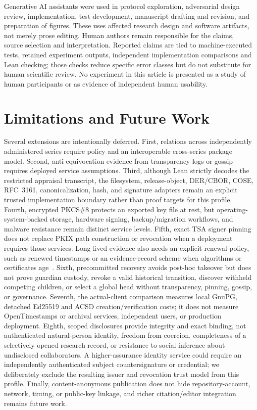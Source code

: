 \documentclass[acmsmall,screen,review,nonacm]{acmart}
\begin{document}
Generative AI assistants were used in protocol exploration, adversarial design
review, implementation, test development, manuscript drafting and revision,
and preparation of figures.  These uses affected research design and software
artifacts, not merely prose editing.  Human authors remain responsible for the
claims, source selection and interpretation.  Reported claims are tied to
machine-executed tests, retained experiment outputs, independent implementation
comparisons and Lean checking; those checks reduce specific error classes but
do not substitute for human scientific review.  No experiment in this article
is presented as a study of human participants or as evidence of independent
human usability.

\section{Limitations and Future Work}

Several extensions are intentionally deferred. First, relations across independently administered series require policy and an interoperable cross-series package model. Second, anti-equivocation evidence from transparency logs or gossip requires deployed service assumptions. Third, although Lean strictly decodes the restricted appraisal transcript, the filesystem, release-object, DER/CBOR, COSE, RFC~3161, canonicalization, hash, and signature adapters remain an explicit trusted implementation boundary rather than proof targets for this profile. Fourth, encrypted PKCS\#8 protects an exported key file at rest, but operating-system-backed storage, hardware signing, backup/migration workflows, and malware resistance remain distinct service levels. Fifth, exact TSA signer pinning does not replace PKIX path construction or revocation when a deployment requires those services. Long-lived evidence also needs an explicit renewal policy, such as renewed timestamps or an evidence-record scheme when algorithms or certificates age~\cite{ers}. Sixth, precommitted recovery avoids post-hoc takeover but does not prove guardian custody, revoke a valid historical transition, discover withheld competing children, or select a global head without transparency, pinning, gossip, or governance. Seventh, the actual-client comparison measures local GnuPG, detached Ed25519 and ACSD creation/verification costs; it does not measure OpenTimestamps or archival services, independent users, or production deployment. Eighth, scoped disclosures provide integrity and exact binding, not authenticated natural-person identity, freedom from coercion, completeness of a selectively opened research record, or resistance to social inference about undisclosed collaborators. A higher-assurance identity service could require an independently authenticated subject countersignature or credential; we deliberately exclude the resulting issuer and revocation trust model from this profile. Finally, content-anonymous publication does not hide repository-account, network, timing, or public-key linkage, and richer citation/editor integration remains future work.
\end{document}
